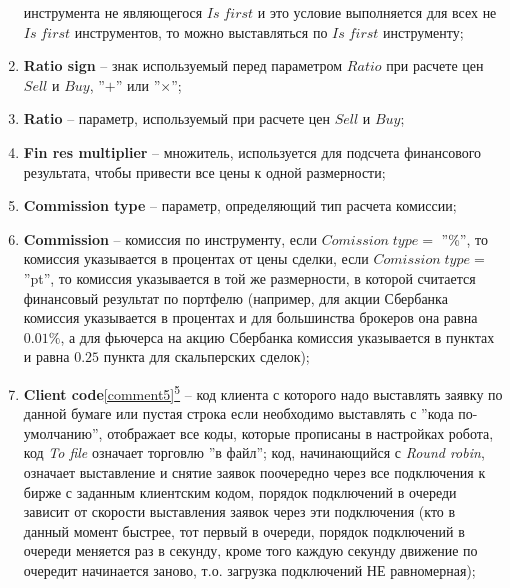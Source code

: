 \begin{enumerate}
		инструмента не являющегося $Is \; first$ и это условие выполняется для всех не $Is \; first$ инструментов, то можно выставляться по $Is \; first$ инструменту;
	\item \textbf{Ratio sign} -- знак используемый перед параметром $Ratio$ при расчете цен $Sell$ и $Buy$, ''$+$'' или ''$\times$'';
	\item \textbf{Ratio} -- параметр, используемый при расчете цен $Sell$ и $Buy$;
	\item \textbf{Fin res multiplier} -- множитель, используется для подсчета финансового результата, чтобы привести все цены к одной размерности;
	\item \textbf{Commission type} -- параметр, определяющий тип расчета комиссии;
	\item \textbf{Commission} -- комиссия по инструменту, если $Comission \; type =$ ''\%'', то комиссия указывается в процентах от цены сделки, если $Comission \; type =$ ''pt'',
		то комиссия указывается в той же размерности, в которой считается финансовый результат по портфелю (например, для акции Сбербанка комиссия указывается
		в процентах и для большинства брокеров она равна $0.01\%$, а для фьючерса на акцию Сбербанка комиссия указывается в пунктах и равна $0.25$ пункта
		для скальперских сделок);
	\item \textbf{Client code}\hyperref[comment5]{\ref{comment5}\textsuperscript{5}} -- код клиента с которого надо выставлять заявку по данной бумаге или пустая строка если необходимо выставлять с ''кода по-умолчанию'',
		отображает все коды, которые прописаны в настройках робота, код \textit{To file} означает торговлю ''в файл''; код, начинающийся с \textit{Round robin}, означает выставление и снятие заявок поочередно через
		все подключения к бирже с заданным клиентским кодом, порядок подключений в очереди зависит от скорости выставления заявок через эти подключения (кто в данный момент быстрее, тот первый в очереди, порядок подключений
		в очереди меняется раз в секунду, кроме того каждую секунду движение по очередит начинается заново, т.о. загрузка подключений НЕ равномерная);
		

\end{enumerate}
